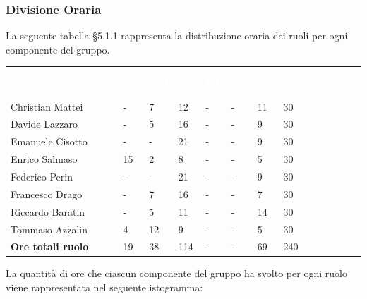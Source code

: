 \subsubsection{Divisione Oraria}
La seguente tabella §5.1.1 rappresenta la distribuzione oraria dei ruoli per ogni componente del gruppo.
{
	\renewcommand{\arraystretch}{2}
	\centering
	\begin{longtable}{ C{5cm} C{1cm} C{1cm} C{1cm} C{1cm} C{1cm} C{1cm} C{3cm}}
		\textcolor{white}{\textbf{Nome membro del gruppo}} & \textcolor{white}{\textbf{RE}} & \textcolor{white}{\textbf{AM}} & \textcolor{white}{\textbf{AN}} & \textcolor{white}{\textbf{PT}} & \textcolor{white}{\textbf{PR}} & \textcolor{white}{\textbf{VE}} & \textcolor{white}{\textbf{Ore complessive}}\\	
        
        
        Christian Mattei     & - & 7 & 12 & - & - & 11 & 30 \\
        Davide Lazzaro       & - & 5 & 16 & - & - & 9 & 30 \\
        Emanuele Cisotto     & - & - & 21 & - & - & 9 & 30 \\
        Enrico Salmaso       & 15 & 2 & 8  & - & - & 5 & 30 \\
        Federico Perin       & - & - & 21 & - & - & 9 & 30 \\
        Francesco Drago      & - & 7 & 16 & - & - & 7 & 30 \\
        Riccardo Baratin     & - & 5 & 11 & - & - & 14 & 30 \\
        Tommaso Azzalin      & 4 & 12 & 9  & - & - & 5 & 30 \\
        \textbf{Ore totali ruolo} & 19 & 38 & 114 & - & - & 69 & 240 \\
		
	\end{longtable}
}

La quantità di ore che ciascun componente del gruppo ha svolto per ogni ruolo viene rappresentata nel seguente istogramma:

\begin{figure}[h]
\end{figure}


